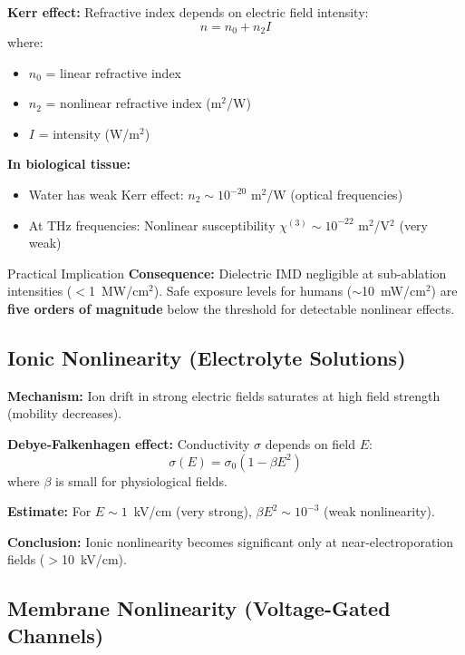 \textbf{Kerr effect:} Refractive index depends on electric field intensity:
\begin{equation}
\label{eq:kerr-effect}
n = n_0 + n_2 I
\end{equation}
where:
\begin{itemize}
\item $n_0$ = linear refractive index
\item $n_2$ = nonlinear refractive index (m$^2$/W)
\item $I$ = intensity (W/m$^2$)
\end{itemize}

\textbf{In biological tissue:}
\begin{itemize}
\item Water has weak Kerr effect: $n_2 \sim 10^{-20}$ m$^2$/W (optical frequencies)
\item At THz frequencies: Nonlinear susceptibility $\chi^{(3)} \sim 10^{-22}$ m$^2$/V$^2$ (very weak)
\end{itemize}

\begin{calloutbox}{Practical Implication}
\textbf{Consequence:} Dielectric IMD negligible at sub-ablation intensities ($<$1~MW/cm$^2$). Safe exposure levels for humans ($\sim$10~mW/cm$^2$) are \textbf{five orders of magnitude} below the threshold for detectable nonlinear effects.
\end{calloutbox}

\subsection{Ionic Nonlinearity (Electrolyte Solutions)}

\textbf{Mechanism:} Ion drift in strong electric fields saturates at high field strength (mobility decreases).

\textbf{Debye-Falkenhagen effect:} Conductivity $\sigma$ depends on field $E$:
\begin{equation}
\label{eq:debye-falkenhagen}
\sigma(E) = \sigma_0 (1 - \beta E^2)
\end{equation}
where $\beta$ is small for physiological fields.

\textbf{Estimate:} For $E \sim 1$~kV/cm (very strong), $\beta E^2 \sim 10^{-3}$ (weak nonlinearity).

\textbf{Conclusion:} Ionic nonlinearity becomes significant only at near-electroporation fields ($>$10~kV/cm).

\subsection{Membrane Nonlinearity (Voltage-Gated Channels)}

